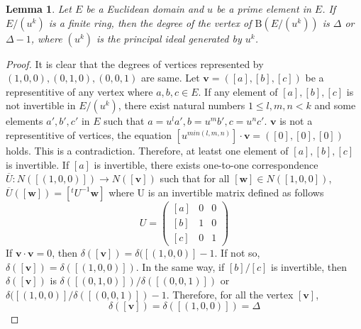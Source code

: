 \documentclass{article}
\newtheorem{Lem}{Lemma}
\newtheorem{Cor}[Lem]{Corollary}
\newcommand{\B}{\mathrm{B}}
\begin{document}
\iffalse

\begin{Lem}
Let $R_1, R_2$ be commutative rings with unit. 
\[ \B(R_1 \times R_2) \simeq \B(R_1) \otimes \B(R_2) \]
\end{Lem}

\begin{Cor}
The followig equations hold.
\begin{enumerate}
\item $ | \B(R_1 \times R_2) | = | \B(R_1) | \times | \B(R_2) | $
\item $ \Delta(\B(R_1 \times R_2)) = \Delta(\B(R_1)) \times \Delta( \B(R_2) )$
\end{enumerate}
\end{Cor}

\fi 

\begin{Lem}\label{Lem:regular}
Let $E$ be a Euclidean domain and $u$ be a prime element in $E$. 
If $E/(u^k)$ is a finite ring, then the degree of the vertex of $\B(E/(u^k))$ is $\Delta$ or $\Delta-1$, 
where $(u^k)$ is the principal ideal generated by $u^k$. 
\end{Lem}

\begin{proof}
It is clear that the degrees of vertices represented by $(1,0,0), (0,1,0), (0,0,1)$ are same.
Let ${\bm v} = ([a],[b],[c])$ be a representitive of any vertex where $a,b,c \in E$. 
If any element of $[a],[b],[c]$ is not invertible in $E/(u^k)$, 
there exist natural numbers $1 \leq l,m,n < k$ and some elements $a',b',c'$ in $E$ such that $a=u^l a', b=u^m b', c=u^n c'$. ${\bm v}$ is not a representitive of vertices, the equation  $[u^{min(l,m,n)}] \cdot {\bm v} = ([0],[0],[0])$ holds. 
This is a contradiction.
Therefore, at leatst one element of $[a],[b],[c]$ is invertible.
If $[a]$ is invertible, there exists one-to-one correspondence $\overline{U}: N([(1,0,0)])  \rightarrow N([{\bm v}])$ such that for all $[{\bm w}] \in N([1,0,0])$, $\overline{U}([\bm w]) = [ {}^t\!U^{-1} {\bm w} ]$ where U is an invertible matrix defined as follows
\[
 U = \left(
 \begin{matrix}
  [a] & 0 & 0 \\
  [b] & 1 & 0 \\
  [c] & 0 & 1
 \end{matrix} \right)
\]
If ${\bm v} \cdot {\bm v} = 0$, then $\delta([\bm v]) = \delta([(1,0,0)] - 1$. If not so, $\delta([\bm v]) = \delta([(1,0,0)])$.
In the same way, if $[b]/[c]$ is invertible, then $\delta([\bm v])$ is $\delta([(0,1,0)])/\delta([(0,0,1)])$ or $\delta([(1,0,0)]/\delta([(0,0,1)]) - 1$.
Therefore, for all the vertex $[{\bm v}]$, 
\[ \delta([\bm v]) = \delta([(1,0,0)]) = \Delta \]

\end{proof}
\end{document}
